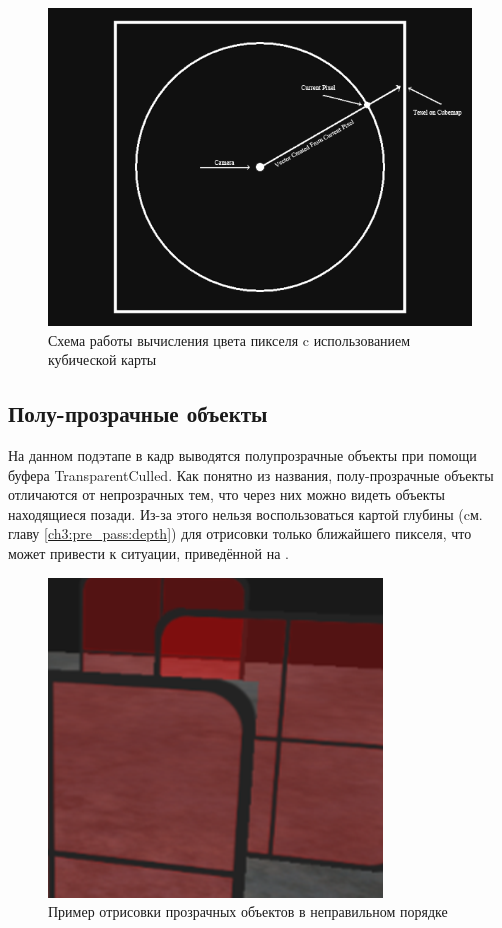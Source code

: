 		\begin{figure}[ht!] 
			\center
			\includegraphics [scale=1] {my_folder/images//cube_sample}	
			\caption{Схема работы вычисления цвета пикселя c использованием кубической карты} 
			\label{fig:cube_sample}
		\end{figure}
		
	\subsection{Полу-прозрачные объекты} \label{ch3:render_pass:transparents}
		На данном подэтапе в кадр выводятся полупрозрачные объекты при помощи буфера TransparentCulled. Как понятно из названия, полу-прозрачные объекты отличаются от непрозрачных тем, что через них можно видеть объекты находящиеся позади. Из-за этого нельзя воспользоваться картой глубины (cм. главу \ref{ch3:pre_pass:depth}) для отрисовки только ближайшего пикселя, что может привести к ситуации, приведённой на .
		
		\begin{figure}[ht!] 
			\center
			\includegraphics [scale=0.5] {my_folder/images//incorrect_transparent}	
			\caption{Пример отрисовки прозрачных объектов в неправильном порядке} 
			\label{fig:incorrect_transparent}
		\end{figure}
		\FloatBarrier
		
